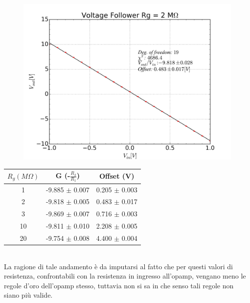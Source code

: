 \documentclass[journal, a4paper]{IEEEtran}
\begin{document}
\begin{figure}[htp]
\caption{}
\label{fit_2O}
\includegraphics[scale=.4]{fit_follower_1_21_2M_2k_22k.png}
\end{figure}



\begin{center}
\begin{tabular}{|c|c|c|}
\hline 
$R_g (M\Omega)$ & G (-$\frac{R_2}{R_1}$) & Offset (V) \\ 
\hline 
1 & -9.885 $\pm$ 0.007 & 0.205 $\pm$ 0.003 \\ 
\hline 
2 & -9.818 $\pm$ 0.005 & 0.483 $\pm$ 0.017 \\ 
\hline 
3 & -9.869 $\pm$ 0.007 & 0.716 $\pm$ 0.003 \\ 
\hline 
10 & -9.811 $\pm$ 0.010 & 2.208 $\pm$ 0.005 \\ 
\hline 
20 & -9.754 $\pm$ 0.008 & 4.400 $\pm$ 0.004 \\ 
\hline 
\end{tabular} 
\end{center}
~\\
La ragione di tale andamento è da imputarsi al fatto che per questi valori di resistenza, confrontabili con la resistenza in ingresso all'opamp, vengano meno le regole d'oro dell'opamp stesso, tuttavia non si sa in che senso tali regole non siano più valide.\\
\end{document}
